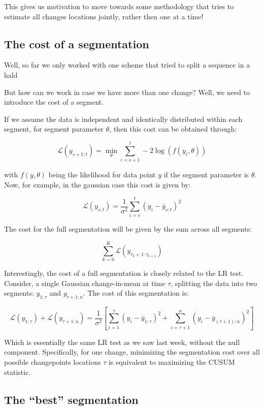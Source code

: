\documentclass[
  letterpaper,
  DIV=11,
  numbers=noendperiod]{scrreprt}
\begin{document}
This gives us motivation to move towards some methodology that tries to
estimate all changes locations jointly, rather then one at a time!

\subsection{The cost of a
segmentation}\label{the-cost-of-a-segmentation}

Well, so far we only worked with one scheme that tried to split a
sequence in a hald

But how can we work in case we have more than one change? Well, we need
to introduce the cost of a segment.

If we assume the data is independent and identically distributed within
each segment, for segment parameter \(\theta\), then this cost can be
obtained through:

\[
    \mathcal{L}(y_{s+1:t}) = \min_\theta \sum_{i = s + 1}^{t} - 2 \log(f(y_i, \theta))
\]

with \(f(y, \theta)\) being the likelihood for data point \(y\) if the
segment parameter is \(\theta\). Now, for example, in the gaussian case
this cost is given by:

\[
\mathcal{L}(y_{s:t}) = \frac{1}{\sigma^2}  \sum_{i = s}^{t} \left ( y_i - \bar{y}_{s:t} \right)^2
\]

The cost for the full segmentation will be given by the sum across all
segments:

\[
\sum_{k = 0}^K \mathcal{L}(y_{\tau_k+1:\tau_{k+1}})
\]

Interestingly, the cost of a full segmentation is closely related to the
LR test. Consider, a single Gaussian change-in-mean at time \(\tau\),
splitting the data into two segments: \(y_{1:\tau}\) and
\(y_{\tau+1:n}\). The cost of this segmentation is:

\[
\mathcal{L}(y_{1:\tau}) + \mathcal{L}(y_{\tau+1:n}) = \frac{1}{\sigma^2} \left[\sum_{i=1}^{\tau} (y_i - \bar{y}_{1:\tau})^2 + \sum_{i=\tau+1}^{n} (y_i - \bar{y}_{(\tau+1):n})^2 \right]
\]

Which is essentially the same LR test as we saw last week, without the
null component. Specifically, for one change, minimizing the
segmentation cost over all possible changepoints locations \(\tau\) is
equivalent to maximizing the CUSUM statistic.

\subsection{The ``best'' segmentation}\label{the-best-segmentation}
\end{document}
